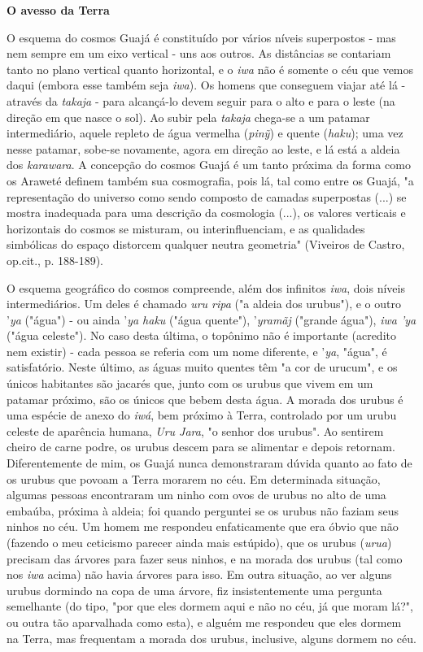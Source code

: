 \textbf{O avesso da Terra}

O esquema do cosmos Guajá é constituído por vários níveis superpostos -
mas nem sempre em um eixo vertical - uns aos outros. As distâncias se
contariam tanto no plano vertical quanto horizontal, e o \emph{iwa} não
é somente o céu que vemos daqui (embora esse também seja \emph{iwa}). Os
homens que conseguem viajar até lá - através da \emph{takaja} - para
alcançá-lo devem seguir para o alto e para o leste (na direção em que
nasce o sol). Ao subir pela \emph{takaja} chega-se a um patamar
intermediário, aquele repleto de água vermelha (\emph{pinỹ}) e quente
(\emph{haku}); uma vez nesse patamar, sobe-se novamente, agora em
direção ao leste, e lá está a aldeia dos \emph{karawara}. A concepção do
cosmos Guajá é um tanto próxima da forma como os Araweté definem também
sua cosmografia, pois lá, tal como entre os Guajá, "a representação do
universo como sendo composto de camadas superpostas (...) se mostra
inadequada para uma descrição da cosmologia (...), os valores verticais
e horizontais do cosmos se misturam, ou interinfluenciam, e as
qualidades simbólicas do espaço distorcem qualquer neutra geometria"
(Viveiros de Castro, op.cit., p. 188-189).

O esquema geográfico do cosmos compreende, além dos infinitos
\emph{iwa}, dois níveis intermediários. Um deles é chamado \emph{uru
ripa} ("a aldeia dos urubus"), e o outro '\emph{ya} ("água") - ou ainda
'\emph{ya haku} ("água quente"), '\emph{yramãj} ("grande água"),
\emph{iwa 'ya} ("água celeste"). No caso desta última, o topônimo não é
importante (acredito nem existir) - cada pessoa se referia com um nome
diferente, e '\emph{ya}, "água", é satisfatório. Neste último, as águas
muito quentes têm "a cor de urucum", e os únicos habitantes são jacarés
que, junto com os urubus que vivem em um patamar próximo, são os únicos
que bebem desta água. A morada dos urubus é uma espécie de anexo do
\emph{iwá}, bem próximo à Terra, controlado por um urubu celeste de
aparência humana, \emph{Uru Jara}, "o senhor dos urubus". Ao sentirem
cheiro de carne podre, os urubus descem para se alimentar e depois
retornam. Diferentemente de mim, os Guajá nunca demonstraram dúvida
quanto ao fato de os urubus que povoam a Terra morarem no céu. Em
determinada situação, algumas pessoas encontraram um ninho com ovos de
urubus no alto de uma embaúba, próxima à aldeia; foi quando perguntei se
os urubus não faziam seus ninhos no céu. Um homem me respondeu
enfaticamente que era óbvio que não (fazendo o meu ceticismo parecer
ainda mais estúpido), que os urubus (\emph{urua}) precisam das árvores
para fazer seus ninhos, e na morada dos urubus (tal como nos \emph{iwa}
acima) não havia árvores para isso. Em outra situação, ao ver alguns
urubus dormindo na copa de uma árvore, fiz insistentemente uma pergunta
semelhante (do tipo, "por que eles dormem aqui e não no céu, já que
moram lá?", ou outra tão aparvalhada como esta), e alguém me respondeu
que eles dormem na Terra, mas frequentam a morada dos urubus, inclusive,
alguns dormem no céu.

